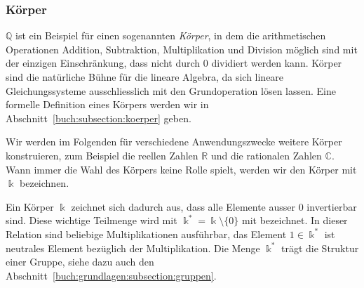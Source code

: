\subsubsection{Körper}
$\mathbb{Q}$ ist ein Beispiel für einen sogenannten {\em Körper}, 
%
in dem die arithmetischen Operationen Addition, Subtraktion, Multiplikation
und Division möglich sind mit der einzigen Einschränkung, dass nicht durch
$0$ dividiert werden kann.
Körper sind die natürliche Bühne für die lineare Algebra, da sich lineare
Gleichungssysteme ausschliesslich mit den Grundoperation lösen lassen.
Eine formelle Definition eines Körpers werden wir in 
Abschnitt~\ref{buch:subsection:koerper} geben.

Wir werden im Folgenden für verschiedene Anwendungszwecke weitere Körper
konstruieren, zum Beispiel die reellen Zahlen $\mathbb{R}$ und die
rationalen Zahlen $\mathbb{C}$.
Wann immer die Wahl des Körpers keine Rolle spielt, werden wir den
Körper mit $\Bbbk$ bezeichnen.
%

Ein Körper $\Bbbk$ zeichnet sich dadurch aus, dass alle Elemente ausser $0$
invertierbar sind. 
Diese wichtige Teilmenge wird mit $\Bbbk^* = \Bbbk \setminus\{0\}$ mit
bezeichnet.
\label{buch:zahlen:def:bbbk*}
In dieser Relation sind beliebige Multiplikationen ausführbar, das Element
$1\in\Bbbk^*$ ist neutrales Element bezüglich der Multiplikation.
Die Menge $\Bbbk^*$ trägt die Struktur einer Gruppe, siehe dazu auch
den Abschnitt~\ref{buch:grundlagen:subsection:gruppen}.


